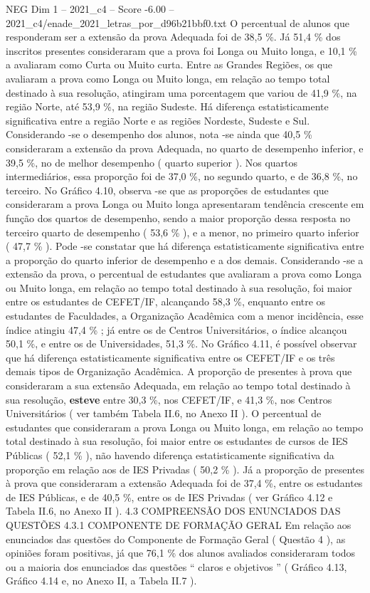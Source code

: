 \begin{textsample}{NEG Dim 1 – 2021\_c4 – Score -6.00 – 2021\_c4/enade\_2021\_letras\_por\_d96b21bbf0.txt}
O percentual de alunos que responderam ser a extensão da prova Adequada foi de 38,5 \%.
Já 51,4 \% dos inscritos presentes consideraram que a prova foi Longa ou Muito longa, e 10,1 \% a avaliaram como Curta ou Muito curta.
Entre as Grandes Regiões, os que avaliaram a prova como Longa ou Muito longa, em relação ao tempo total destinado à sua resolução, atingiram uma porcentagem que variou de 41,9 \%, na região Norte, até 53,9 \%, na região Sudeste.
Há diferença estatisticamente significativa entre a região Norte e as regiões Nordeste, Sudeste e Sul.
Considerando -se o desempenho dos alunos, nota -se ainda que 40,5 \% consideraram a extensão da prova Adequada, no quarto de desempenho inferior, e 39,5 \%, no de melhor desempenho ( quarto superior ).
Nos quartos intermediários, essa proporção foi de 37,0 \%, no segundo quarto, e de 36,8 \%, no terceiro.
No Gráfico 4.10, observa -se que as proporções de estudantes que consideraram a prova Longa ou Muito longa apresentaram tendência crescente em função dos quartos de desempenho, sendo a maior proporção dessa resposta no terceiro quarto de desempenho ( 53,6 \% ), e a menor, no primeiro quarto inferior ( 47,7 \% ).
Pode -se constatar que há diferença estatisticamente significativa entre a proporção do quarto inferior de desempenho e a dos demais.
Considerando -se a extensão da prova, o percentual de estudantes que avaliaram a prova como Longa ou Muito longa, em relação ao tempo total destinado à sua resolução, foi maior entre os estudantes de CEFET/IF, alcançando 58,3 \%, enquanto entre os estudantes de Faculdades, a Organização Acadêmica com a menor incidência, esse índice atingiu 47,4 \% ; já entre os de Centros Universitários, o índice alcançou 50,1 \%, e entre os de Universidades, 51,3 \%.
No Gráfico 4.11, é possível observar que há diferença estatisticamente significativa entre os CEFET/IF e os três demais tipos de Organização Acadêmica.
A proporção de presentes à prova que consideraram a sua extensão Adequada, em relação ao tempo total destinado à sua resolução, \textbf{esteve} entre 30,3 \%, nos CEFET/IF, e 41,3 \%, nos Centros Universitários ( ver também Tabela II.6, no Anexo II ).
O percentual de estudantes que consideraram a prova Longa ou Muito longa, em relação ao tempo total destinado à sua resolução, foi maior entre os estudantes de cursos de IES Públicas ( 52,1 \% ), não havendo diferença estatisticamente significativa da proporção em relação aos de IES Privadas ( 50,2 \% ).
Já a proporção de presentes à prova que consideraram a extensão Adequada foi de 37,4 \%, entre os estudantes de IES Públicas, e de 40,5 \%, entre os de IES Privadas ( ver Gráfico 4.12 e Tabela II.6, no Anexo II ). 4.3 COMPREENSÃO DOS ENUNCIADOS DAS QUESTÕES 4.3.1 COMPONENTE DE FORMAÇÃO GERAL Em relação aos enunciados das questões do Componente de Formação Geral ( Questão 4 ), as opiniões foram positivas, já que 76,1 \% dos alunos avaliados consideraram todos ou a maioria dos enunciados das questões “ claros e objetivos ” ( Gráfico 4.13, Gráfico 4.14 e, no Anexo II, a Tabela II.7 ).

\end{textsample}
